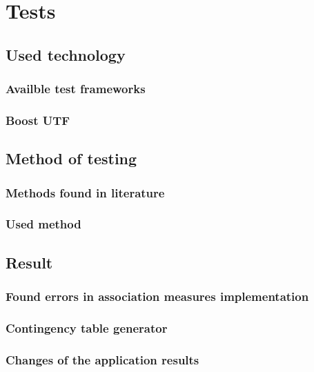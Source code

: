 \chapter{Tests}

\section{Used technology}

\subsection{Availble test frameworks}

\subsection{Boost UTF}

\section{Method of testing}

\subsection{Methods found in literature}

\subsection{Used method}

\section{Result}

\subsection{Found errors in association measures implementation}

\subsection{Contingency table generator}

\subsection{Changes of the application results}